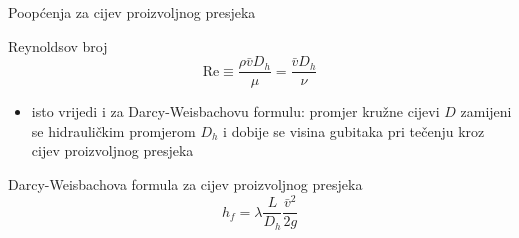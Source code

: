 \documentclass{beamer}
\begin{document}
\begin{frame}{Poopćenja za cijev proizvoljnog presjeka}

\begin{block}{Reynoldsov broj}
\[
\mathrm{Re}\equiv\frac{\rho\bar{v}D_{h}}{\mu}=\frac{\bar{v}D_{h}}{\nu}
\]
\end{block}
\begin{itemize}
\item isto vrijedi i za Darcy-Weisbachovu formulu: promjer kružne cijevi
$D$ zamijeni se hidrauličkim promjerom $D_{h}$ i dobije se visina
gubitaka pri tečenju kroz cijev proizvoljnog presjeka
\end{itemize}
\begin{block}{Darcy-Weisbachova formula za cijev proizvoljnog presjeka}
\[
h_{f}=\lambda\frac{L}{D_{h}}\frac{\bar{v}^{2}}{2g}
\]
\end{block}
\end{frame}
\end{document}
